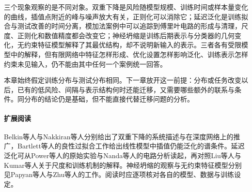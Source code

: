 三个现象观察的是不同对象。双重下降是风险随模型规模、训练时间或样本量变化的曲线，插值点附近的峰与噪声放大有关，正则化可以消除它；延迟泛化是训练拟合与测试改善的时间分离，模加法案例中可以追踪到傅里叶电路的形成与清理，尺度、正则化和数值精度都会改变它；神经坍缩是训练后期表示与分类器的几何变化，无约束特征模型解释了其最优结构，却不说明新输入的表示。三者各有受限模型中的解释，但有限网络中特征怎样形成、优化设置怎样影响泛化、训练表示怎样约束未见输入，仍不能由其中任何一个案例统一回答。

本章始终假定训练分布与测试分布相同。下一章放开这一前提：分布或任务改变以后，已有的低风险、间隔与表示结构何时还能迁移，又需要哪些额外的联系与条件。同分布的结论仍是基础，但不能直接代替迁移问题的分析。

\paragraph{扩展阅读}

Belkin等人与Nakkiran等人分别给出了双重下降的系统描述与在深度网络上的推广，Bartlett等人的良性过拟合工作给出线性模型中插值仍能泛化的谱条件。延迟泛化可从Power等人的原始实验与Nanda等人的电路分析读起，再对照Liu等人与Kumar等人关于尺度和训练机制的解释。神经坍缩的观察与无约束特征模型分别见Papyan等人与Zhu等人的工作。阅读时应逐项核对各自的模型、数据与训练设定。
